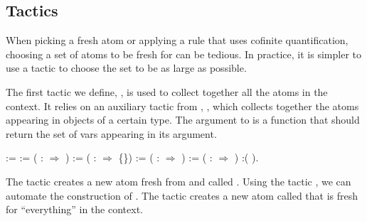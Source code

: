 \documentclass[12pt]{report}
\begin{document}
\subsection{Tactics}



 When picking a fresh atom or applying a rule that uses cofinite
    quantification, choosing a set of atoms to be fresh for can be
    tedious.  In practice, it is simpler to use a tactic to choose the
    set to be as large as possible.


    The first tactic we define, , is used to collect
    together all the atoms in the context.  It relies on an auxiliary
    tactic from , , which collects
    together the atoms appearing in objects of a certain type.  The argument 
    to  is a function that should return the set of
    vars appearing in its argument. 
\begin{coqdoccode}
\coqdocemptyline
\coqdocnoindent
{}  :=\coqdoceol
\coqdocindent{1.00em}
  :=  (  :  \ensuremath{\Rightarrow} ) \coqdoceol
\coqdocindent{1.00em}
  :=  (  :  \ensuremath{\Rightarrow} \{\}) \coqdoceol
\coqdocindent{1.00em}
  :=  (  :  \ensuremath{\Rightarrow}  ) \coqdoceol
\coqdocindent{1.00em}
  :=  (  :  \ensuremath{\Rightarrow}  ) \coqdoceol
\coqdocindent{1.00em}
:(      ).\coqdoceol
\coqdocemptyline
\end{coqdoccode}
The tactic    creates a new atom fresh 
    from  and called . Using the tactic ,
    we can automate the construction of . The tactic
      creates a new atom called  that is fresh
    for ``everything'' in the context.
\end{document}
